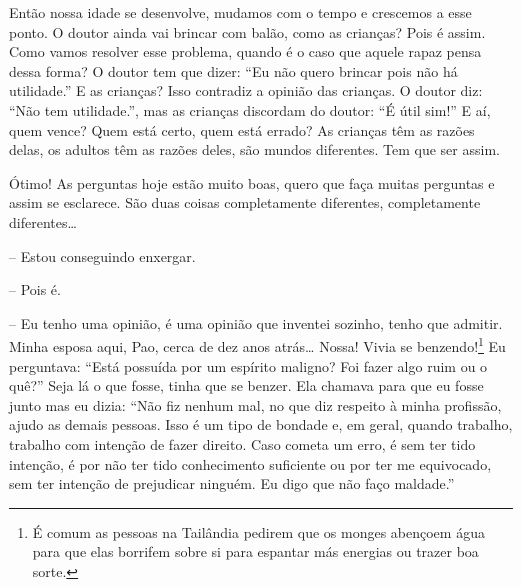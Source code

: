 Então nossa idade se desenvolve, mudamos com o tempo e crescemos a
esse ponto. O doutor ainda vai brincar com balão, como as crianças?
Pois é assim. Como vamos resolver esse problema, quando é o caso que
aquele rapaz pensa dessa forma? O doutor tem que dizer: “Eu não quero
brincar pois não há utilidade.” E as crianças? Isso contradiz a opinião
das crianças. O doutor diz: “Não tem utilidade.”, mas as crianças
discordam do doutor: “É útil sim!” E aí, quem vence? Quem está certo,
quem está errado? As crianças têm as razões delas, os adultos têm as
razões deles, são mundos diferentes. Tem que ser assim. 

Ótimo! As perguntas hoje estão muito boas, quero que faça muitas
perguntas e assim se esclarece. São duas coisas completamente
diferentes, completamente diferentes…

-- Estou conseguindo enxergar.

-- Pois é. 

-- Eu tenho uma opinião, é uma opinião que inventei sozinho, tenho
que admitir. Minha esposa aqui, Pao, cerca de dez anos atrás… Nossa!
Vivia se benzendo!\footnote{É comum as pessoas na Tailândia pedirem que
os monges abençoem água para que elas borrifem sobre si para espantar
más energias ou trazer boa sorte.} Eu perguntava: “Está possuída por
um espírito maligno? Foi fazer algo ruim ou o quê?” Seja lá o que
fosse, tinha que se benzer. Ela chamava para que eu fosse junto mas eu
dizia: “Não fiz nenhum mal, no que diz respeito à minha profissão,
ajudo as demais pessoas. Isso é um tipo de bondade e, em geral, quando
trabalho, trabalho com intenção de fazer direito. Caso cometa um erro,
é sem ter tido intenção, é por não ter tido conhecimento suficiente ou
por ter me equivocado, sem ter intenção de prejudicar ninguém. Eu digo
que não faço maldade.”

